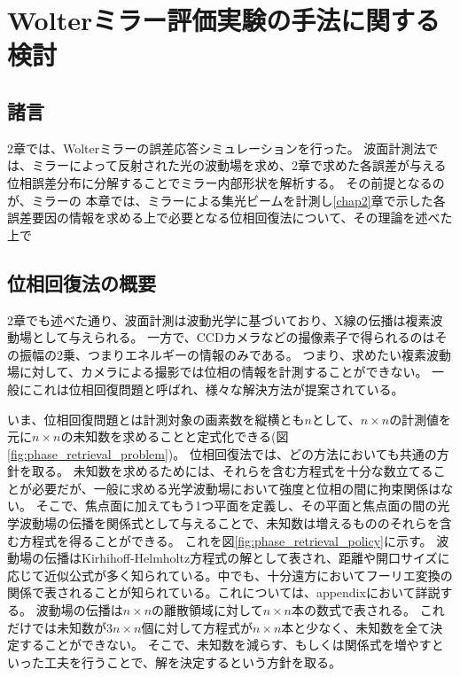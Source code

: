 \chapter{Wolterミラー評価実験の手法に関する検討}
\thispagestyle{empty}
\label{chap3}
\graphicspath{{chap3/figure/}}
\minitoc

\newpage


\section{諸言}
\label{chap3_introduction}

2章では、Wolterミラーの誤差応答シミュレーションを行った。
波面計測法では、ミラーによって反射された光の波動場を求め、2章で求めた各誤差が与える位相誤差分布に分解することでミラー内部形状を解析する。
その前提となるのが、ミラーの
本章では、ミラーによる集光ビームを計測し\ref{chap2}章で示した各誤差要因の情報を求める上で必要となる位相回復法について、その理論を述べた上で

\clearpage
\newpage


\section{位相回復法の概要}

2章でも述べた通り、波面計測は波動光学に基づいており、X線の伝播は複素波動場として与えられる。
一方で、CCDカメラなどの撮像素子で得られるのはその振幅の2乗、つまりエネルギーの情報のみである。
つまり、求めたい複素波動場に対して、カメラによる撮影では位相の情報を計測することができない。
一般にこれは位相回復問題と呼ばれ、様々な解決方法が提案されている。

いま、位相回復問題とは計測対象の画素数を縦横とも$n$として、$n \times n$の計測値を元に$n \times n$の未知数を求めることと定式化できる(図\ref{fig:phase_retrieval_problem})。
位相回復法では、どの方法においても共通の方針を取る。
未知数を求めるためには、それらを含む方程式を十分な数立てることが必要だが、一般に求める光学波動場において強度と位相の間に拘束関係はない。
そこで、焦点面に加えてもう1つ平面を定義し、その平面と焦点面の間の光学波動場の伝播を関係式として与えることで、未知数は増えるもののそれらを含む方程式を得ることができる。
これを図\ref{fig:phase_retrieval_policy}に示す。
波動場の伝播はKirhihoff-Helmholtz方程式の解として表され、距離や開口サイズに応じて近似公式が多く知られている。中でも、十分遠方においてフーリエ変換の関係で表されることが知られている。これについては、appendixにおいて詳説する。
波動場の伝播は$n \times n$の離散領域に対して$n \times n$本の数式で表される。
これだけでは未知数が$3n \times n$個に対して方程式が$n \times n$本と少なく、未知数を全て決定することができない。
そこで、未知数を減らす、もしくは関係式を増やすといった工夫を行うことで、解を決定するという方針を取る。

